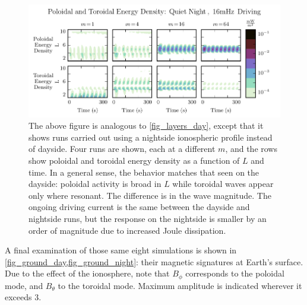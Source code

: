 \documentclass[draft,linenumbers]{agujournal}
\begin{document}
\begin{figure}
    \begin{center}
    \includegraphics[width=\textwidth]{figures/fig_layers_night.pdf}
    \caption{
        The above figure is analogous to \cref{fig_layers_day}, except that it shows runs carried out using a nightside ionospheric profile instead of dayside. Four runs are shown, each at a different $m$, and the rows show poloidal and toroidal energy density as a function of $L$ and time. In a general sense, the behavior matches that seen on the dayside: poloidal activity is broad in $L$ while toroidal waves appear only where resonant. The difference is in the wave magnitude. The ongoing driving current is the same between the dayside and nightside runs, but the response on the nightside is smaller by an order of magnitude due to increased Joule dissipation.
    }
    \label{fig_layers_night}
    \end{center}
\end{figure}

A final examination of those same eight simulations is shown in \cref{fig_ground_day,fig_ground_night}: their magnetic signatures at Earth's surface. Due to the effect of the ionosphere, note that $B_\phi$ corresponds to the poloidal mode, and $B_\theta$ to the toroidal mode. Maximum amplitude is indicated wherever it exceeds \SI{3}{\nT}.
\end{document}
